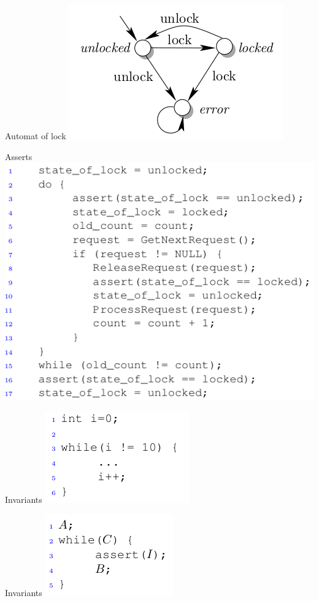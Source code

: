 \documentclass{beamer}
\begin{document}
\begin{frame}{Automat of lock}
\includegraphics[scale=0.5]{lock_automaton.png}
\end{frame}

\begin{frame}{Asserts}
\includegraphics[scale=0.5]{asserts.png}
\end{frame}

\begin{frame}{Invariants}
\includegraphics[scale=0.45]{li1.png}
\end{frame}

\begin{frame}{Invariants}
\includegraphics[scale=0.45]{li2.png}
\end{frame}
\end{document}
